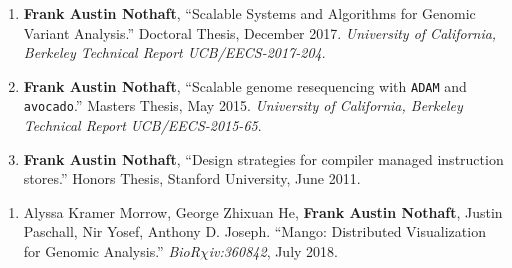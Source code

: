 \documentclass[10pt]{article} %
\newcounter{pubCtr}
\begin{document}
\begin {minipage}[t]{0.8\linewidth}
\begin{enumerate}
\setcounter{enumi}{\thepubCtr}
\item {\textbf{Frank Austin Nothaft}, ``Scalable Systems and Algorithms for Genomic Variant Analysis.''
Doctoral Thesis, December 2017. \emph{University of California, Berkeley Technical Report UCB/EECS-2017-204}.} 
\item {\textbf{Frank Austin Nothaft}, ``Scalable genome resequencing with \texttt{ADAM} and \texttt{avocado}.''
Masters Thesis, May 2015. \emph{University of California, Berkeley Technical Report UCB/EECS-2015-65}.} 
\item {\textbf{Frank Austin Nothaft}, ``Design strategies for compiler managed instruction stores.''
Honors Thesis, Stanford University, June 2011.}
\setcounter{pubCtr}{\theenumi}
\end{enumerate}


\begin{enumerate}
\setcounter{enumi}{\thepubCtr}
\item {Alyssa Kramer Morrow, George Zhixuan He, \textbf{Frank Austin Nothaft}, Justin Paschall,
Nir Yosef, Anthony D. Joseph. ``Mango: Distributed Visualization for Genomic Analysis.''
\emph{BioR$\chi$iv:360842}, July 2018.}
\end{enumerate}
  
\noindent{}
\end {minipage}

\begin {minipage}[t]{0.2\linewidth}
\vspace{0pt}
\end {minipage}
\begin {minipage}[t]{0.8\linewidth}
\vspace{0pt}

 \\
 \\
 \\
 \\
 \\
 \\
 \\

\end {minipage}
\end{document}
